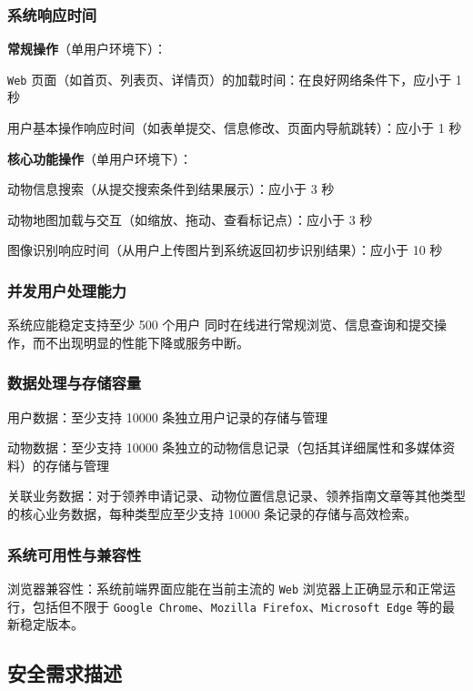 \documentclass[12pt,a4paper,UTF8]{article}
\begin{document}
\subsubsection{系统响应时间}

\noindent\textbf{常规操作}（单用户环境下）：

\verb|Web| 页面（如首页、列表页、详情页）的加载时间：在良好网络条件下，应小于 1 秒

用户基本操作响应时间（如表单提交、信息修改、页面内导航跳转）：应小于 1 秒

\vspace{0.25cm}

\noindent\textbf{核心功能操作}（单用户环境下）：

动物信息搜索（从提交搜索条件到结果展示）：应小于 3 秒

动物地图加载与交互（如缩放、拖动、查看标记点）：应小于 3 秒

图像识别响应时间（从用户上传图片到系统返回初步识别结果）：应小于 10 秒

\subsubsection{并发用户处理能力}

系统应能稳定支持至少 500 个用户 同时在线进行常规浏览、信息查询和提交操作，而不出现明显的性能下降或服务中断。

\subsubsection{数据处理与存储容量}


用户数据：至少支持 10000 条独立用户记录的存储与管理

动物数据：至少支持 10000 条独立的动物信息记录（包括其详细属性和多媒体资料）的存储与管理

关联业务数据：对于领养申请记录、动物位置信息记录、领养指南文章等其他类型的核心业务数据，每种类型应至少支持 10000 条记录的存储与高效检索。

\subsubsection{系统可用性与兼容性}


浏览器兼容性：系统前端界面应能在当前主流的 \verb|Web| 浏览器上正确显示和正常运行，包括但不限于 \verb|Google Chrome|、\verb|Mozilla Firefox|、\verb|Microsoft Edge| 等的最新稳定版本。

\subsection{安全需求描述}
\end{document}
